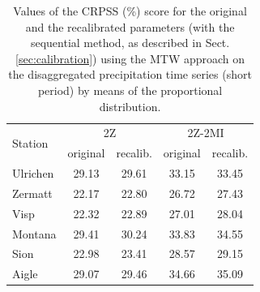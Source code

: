 \documentclass[hess, manuscript]{copernicus}
\begin{document}
	\begin{table}[htb]
		\caption{Values of the CRPSS (\%) score for the original and the recalibrated parameters (with the sequential method, as described in Sect. \ref{sec:calibration}) using the MTW approach on the disaggregated precipitation time series (short period) by means of the proportional distribution.}
		\begin{center}
			\begin{tabular}{l c c c c}
				\hline
				\multirow{2}{*}{Station} & \multicolumn{2}{c}{2Z} & \multicolumn{ 2}{c}{2Z-2MI} \\
				& original & recalib. & original & recalib. \\
				\hline
				Ulrichen & 29.13 & 29.61 & 33.15 & 33.45 \\
				Zermatt & 22.17 & 22.80 & 26.72 & 27.43 \\
				Visp & 22.32 & 22.89 & 27.01 & 28.04 \\
				Montana & 29.41 & 30.24 & 33.83 & 34.55 \\
				Sion & 22.98 & 23.41 & 28.57 & 29.15 \\
				Aigle & 29.07 & 29.46 & 34.66 & 35.09 \\
				\hline
			\end{tabular}
		\end{center}
		\label{table:disaggregation_proportional}
	\end{table}
	
\end{document}

